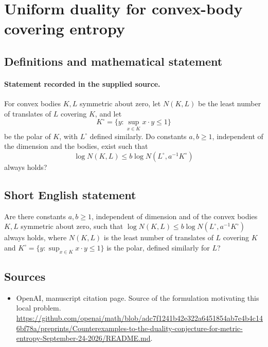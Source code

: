 \documentclass[11pt]{article}
\begin{document}
\section*{Uniform duality for convex-body covering entropy}\label{statement}
\subsection{Definitions and mathematical statement}
\paragraph{Statement recorded in the supplied source.}
For convex bodies $K,L$ symmetric about zero, let $N(K,L)$ be the least number of translates of $L$ covering $K$, and let
\[
K^\circ=\{y:\sup_{x\in K}x\cdot y\leq1\}
\]
be the polar of $K$, with $L^\circ$ defined similarly. Do constants $a,b\geq1$, independent of the dimension and the bodies, exist such that
\[
\log N(K,L)\leq b\log N(L^\circ,a^{-1}K^\circ)
\]
always holds?
\subsection{Short English statement}
Are there constants $a,b\geq1$, independent of dimension and of the convex bodies $K,L$ symmetric about zero, such that $\log N(K,L)\leq b\log N(L^\circ,a^{-1}K^\circ)$ always holds, where $N(K,L)$ is the least number of translates of $L$ covering $K$ and $K^\circ=\{y:\sup_{x\in K}x\cdot y\leq1\}$ is the polar, defined similarly for $L$?
\subsection{Sources}
\begin{itemize}
\item[S1] OpenAI, manuscript citation page. Source of the formulation motivating this local problem.
\url{https://github.com/openai/math/blob/adc7f1241b42e322a6451854ab7e4b4c146bf78a/preprints/Counterexamples-to-the-duality-conjecture-for-metric-entropy-September-24-2026/README.md}.
\end{itemize}
\end{document}
